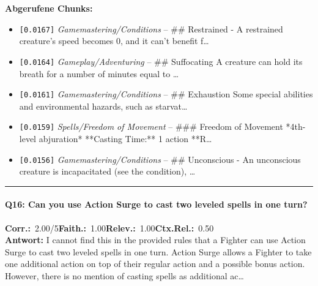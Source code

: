 \noindent\textbf{Abgerufene Chunks:}
\begin{itemize}[noitemsep, topsep=2pt]
  \item[\textbf{\#1}] \texttt{[0.0167]} \textit{Gamemastering/Conditions} -- \#\# Restrained  - A restrained creature's speed becomes 0, and it can't benefit f\ldots
  \item[\textbf{\#2}] \texttt{[0.0164]} \textit{Gameplay/Adventuring} -- \#\# Suffocating  A creature can hold its breath for a number of minutes equal to \ldots
  \item[\textbf{\#3}] \texttt{[0.0161]} \textit{Gamemastering/Conditions} -- \#\# Exhaustion  Some special abilities and environmental hazards, such as starvat\ldots
  \item[\textbf{\#4}] \texttt{[0.0159]} \textit{Spells/Freedom of Movement} -- \#\#\# Freedom of Movement  *4th-level abjuration*  **Casting Time:** 1 action  **R\ldots
  \item[\textbf{\#5}] \texttt{[0.0156]} \textit{Gamemastering/Conditions} -- \#\# Unconscious  - An unconscious creature is incapacitated (see the condition), \ldots
\end{itemize}
\vspace{4pt}
\hrule
\vspace{6pt}

\paragraph{Q16: Can you use Action Surge to cast two leveled spells in one turn?}
\noindent \textbf{Corr.:}~2.00/5\quad \textbf{Faith.:}~1.00\quad \textbf{Relev.:}~1.00\quad \textbf{Ctx.Rel.:}~0.50\\

\noindent\textbf{Antwort:} I cannot find this in the provided rules that a Fighter can use Action Surge to cast two leveled spells in one turn. Action Surge allows a Fighter to take one additional action on top of their regular action and a possible bonus action. However, there is no mention of casting spells as additional ac\ldots

